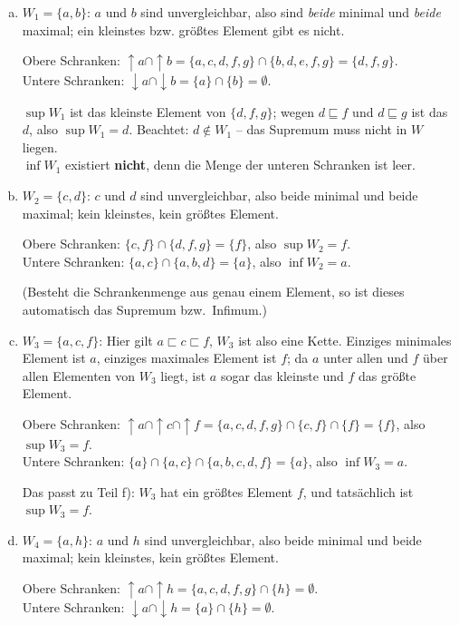 \begin{loesung}
\begin{enumerate}[a)]
  \item $W_1=\{a,b\}$: $a$ und $b$ sind unvergleichbar, also sind \emph{beide} minimal und \emph{beide} maximal; ein kleinstes bzw. größtes Element gibt es nicht.

  Obere Schranken: $\uparrow\! a\cap\uparrow\! b=\{a,c,d,f,g\}\cap\{b,d,e,f,g\}=\{d,f,g\}$.\\
  Untere Schranken: $\downarrow\! a\cap\downarrow\! b=\{a\}\cap\{b\}=\emptyset$.

  $\sup W_1$ ist das kleinste Element von $\{d,f,g\}$; wegen $d\sqsubseteq f$ und $d\sqsubseteq g$ ist das $d$, also $\sup W_1=d$. Beachtet: $d\notin W_1$ -- das Supremum muss nicht in $W$ liegen.\\
  $\inf W_1$ existiert \textbf{nicht}, denn die Menge der unteren Schranken ist leer.

  \item $W_2=\{c,d\}$: $c$ und $d$ sind unvergleichbar, also beide minimal und beide maximal; kein kleinstes, kein größtes Element.

  Obere Schranken: $\{c,f\}\cap\{d,f,g\}=\{f\}$, also $\sup W_2=f$.\\
  Untere Schranken: $\{a,c\}\cap\{a,b,d\}=\{a\}$, also $\inf W_2=a$.

  (Besteht die Schrankenmenge aus genau einem Element, so ist dieses automatisch das Supremum bzw.\ Infimum.)

  \item $W_3=\{a,c,f\}$: Hier gilt $a\sqsubset c\sqsubset f$, $W_3$ ist also eine Kette. Einziges minimales Element ist $a$, einziges maximales Element ist $f$; da $a$ unter allen und $f$ über allen Elementen von $W_3$ liegt, ist $a$ sogar das kleinste und $f$ das größte Element.

  Obere Schranken: $\uparrow\! a\cap\uparrow\! c\cap\uparrow\! f=\{a,c,d,f,g\}\cap\{c,f\}\cap\{f\}=\{f\}$, also $\sup W_3=f$.\\
  Untere Schranken: $\{a\}\cap\{a,c\}\cap\{a,b,c,d,f\}=\{a\}$, also $\inf W_3=a$.

  Das passt zu Teil f): $W_3$ hat ein größtes Element $f$, und tatsächlich ist $\sup W_3=f$.

  \item $W_4=\{a,h\}$: $a$ und $h$ sind unvergleichbar, also beide minimal und beide maximal; kein kleinstes, kein größtes Element.

  Obere Schranken: $\uparrow\! a\cap\uparrow\! h=\{a,c,d,f,g\}\cap\{h\}=\emptyset$.\\
  Untere Schranken: $\downarrow\! a\cap\downarrow\! h=\{a\}\cap\{h\}=\emptyset$.


\end{enumerate}
\end{loesung}
